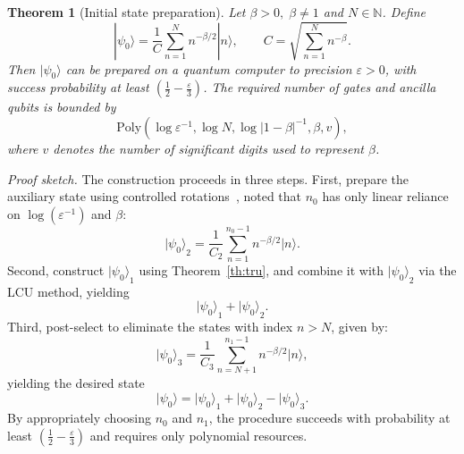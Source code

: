 \documentclass[aps,pra,twocolumn,superscriptaddress,preprintnumbers,amsmath,amssymb]{revtex4-2}
\newtheorem{Theorem}{Theorem}
\begin{document}
\begin{Theorem}[Initial state preparation]\label{th:init}
Let $\beta>0,\;\beta \neq 1$ and $N\in\mathbb{N}$. Define
    \begin{equation}
        |\psi_0\rangle=\frac{1}{C}\textstyle\sum\limits_{n=1}^{N}n^{-\beta/2}|n\rangle, \qquad C=\sqrt{\textstyle\sum\limits_{n=1}^{N}n^{-\beta}}.
    \end{equation}
    Then  $|\psi_0\rangle$ can be prepared on a quantum computer to precision $\varepsilon>0$, with success probability at least $(\frac{1}{2}-\frac{\varepsilon}{3})$. The required number of gates and ancilla qubits is bounded by
    \begin{equation}
        \mathrm{Poly}( \log \varepsilon^{-1},\log N,\log|1-\beta|^{-1},\beta,v),
    \end{equation}
where $v$ denotes the number of significant digits used to represent $\beta$.
\end{Theorem}
\emph{Proof sketch.} The construction proceeds in three steps.  
First, prepare the auxiliary state using  controlled rotations~\cite{long2001efficient}, noted that $n_0$ has only linear reliance on $\log(\varepsilon^{-1})$ and $\beta$:
\begin{equation}
    {|\psi_{0}\rangle}_2=\frac{1}{C_2}\textstyle\sum\limits_{n=1}^{n_0-1}n^{-\beta/2}|n\rangle.
\end{equation}
Second, construct ${|\psi_{0}\rangle}_1$ using Theorem~\ref{th:tru},
and combine it with ${|\psi_{0}\rangle}_2$ via the LCU method, yielding
\begin{equation}
    {|\psi_{0}\rangle}_1+{|\psi_{0}\rangle}_2.
\end{equation}
Third, post-select to eliminate the states with index $n> N$, given by:
\begin{equation}
    {|\psi_{0}\rangle}_3=\frac{1}{C_3}\textstyle\sum\limits_{n=N+1}^{n_1-1}n^{-\beta/2}|n\rangle,
\end{equation}
yielding the desired state
\begin{equation}
    |\psi_{0}\rangle={|\psi_{0}\rangle}_1+{|\psi_{0}\rangle}_2-{|\psi_{0}\rangle}_3.
\end{equation}
By appropriately choosing $n_0$ and $n_1$, the  procedure succeeds with probability at least $(\frac{1}{2}-\tfrac{\varepsilon}{3})$ and requires only polynomial resources.
\end{document}
